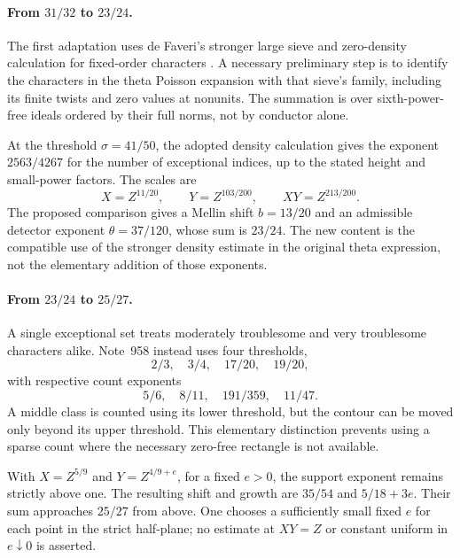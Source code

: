 \paragraph{From $31/32$ to $23/24$.}
The first adaptation \cite{R957} uses de Faveri's stronger large sieve and zero-density calculation for fixed-order characters \cite{DF26}. A necessary preliminary step is to identify the characters in the theta Poisson expansion with that sieve's family, including its finite twists and zero values at nonunits. The summation is over sixth-power-free ideals ordered by their full norms, not by conductor alone.

At the threshold $\sigma=41/50$, the adopted density calculation gives the exponent $2563/4267$ for the number of exceptional indices, up to the stated height and small-power factors. The scales are
\[
 X=Z^{11/20},\qquad Y=Z^{103/200},\qquad XY=Z^{213/200}.
\]
The proposed comparison gives a Mellin shift $b=13/20$ and an admissible detector exponent $\theta=37/120$, whose sum is $23/24$. The new content is the compatible use of the stronger density estimate in the original theta expression, not the elementary addition of those exponents.

\paragraph{From $23/24$ to $25/27$.}
A single exceptional set treats moderately troublesome and very troublesome characters alike. Note~958 \cite{R958} instead uses four thresholds,
\[
 2/3,\quad3/4,\quad17/20,\quad19/20,
\]
with respective count exponents
\[
 5/6,\quad8/11,\quad191/359,\quad11/47.
\]
A middle class is counted using its lower threshold, but the contour can be moved only beyond its upper threshold. This elementary distinction prevents using a sparse count where the necessary zero-free rectangle is not available.

With $X=Z^{5/9}$ and $Y=Z^{4/9+e}$, for a fixed $e>0$, the support exponent remains strictly above one. The resulting shift and growth are $35/54$ and $5/18+3e$. Their sum approaches $25/27$ from above. One chooses a sufficiently small fixed $e$ for each point in the strict half-plane; no estimate at $XY=Z$ or constant uniform in $e\downarrow0$ is asserted.

